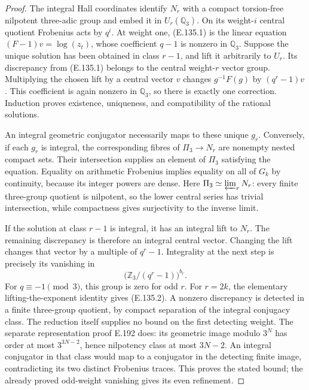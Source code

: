 \begin{proof}
The integral Hall coordinates identify $N_r$ with a
compact torsion-free nilpotent three-adic group and
embed it in $U_r(\mathbb Q_3)$. On its weight-$i$
central quotient Frobenius acts by $q^i$.
At weight one, (E.135.1) is the linear equation
$(F-1)v=\log(z_t)$, whose coefficient $q-1$ is
nonzero in $\mathbb Q_3$.
Suppose the unique solution has been obtained in
class $r-1$, and lift it arbitrarily to $U_r$.
Its discrepancy from (E.135.1) belongs to the
central weight-$r$ vector group. Multiplying the
chosen lift by a central vector $v$ changes
$g^{-1}F(g)$ by $(q^r-1)v$.
This coefficient is again nonzero in $\mathbb Q_3$,
so there is exactly one correction. Induction proves
existence, uniqueness, and compatibility of the
rational solutions.

An integral geometric conjugator necessarily maps
to these unique $g_r$. Conversely, if each $g_r$
is integral, the corresponding fibres of
$\Pi_3\to N_r$ are nonempty nested compact sets.
Their intersection supplies an element of $\Pi_3$
satisfying the equation. Equality on arithmetic
Frobenius implies equality on all of $G_k$ by
continuity, because its integer powers are dense.
Here $\Pi_3\simeq\varprojlim_rN_r$: every finite
three-group quotient is nilpotent, so the lower
central series has trivial intersection, while
compactness gives surjectivity to the inverse limit.

If the solution at class $r-1$ is integral, it has
an integral lift to $N_r$. The remaining discrepancy
is therefore an integral central vector. Changing
the lift changes that vector by a multiple of
$q^r-1$. Integrality at the next step is precisely
its vanishing in
\[
                   \bigl(\mathbb Z_3/(q^r-1)\bigr)^{b_r}.
\]
For $q\equiv-1\pmod3$, this group is zero for
odd $r$. For $r=2k$, the elementary lifting-the-exponent
identity gives (E.135.2). A nonzero discrepancy is
detected in a finite three-group quotient, by compact
separation of the integral conjugacy class.
The reduction itself supplies no bound on the first
detecting weight.  The separate representation proof
E.192 does: its geometric image modulo $3^N$ has order
at most $3^{3N-2}$, hence nilpotency class at most
$3N-2$.  An integral conjugator in that class would
map to a conjugator in the detecting finite image,
contradicting its two distinct Frobenius traces.
This proves the stated bound; the already proved
odd-weight vanishing gives its even refinement.


\end{proof}
